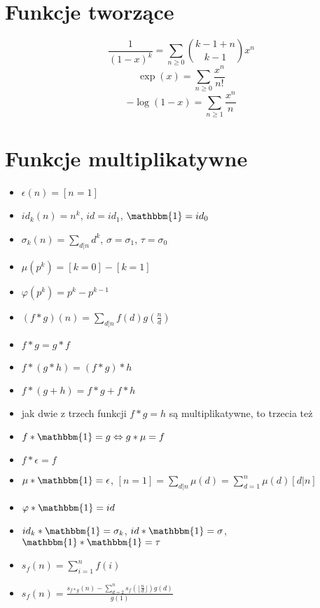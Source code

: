 \section{Funkcje tworzące}
		$$ \dfrac{1}{\left(1-x\right)^k} = \sum_{n\geq 0} \binom{k - 1 + n}{k - 1} x ^ n $$
		$$ \exp(x) = \sum_{n\geq 0} \dfrac{x^n}{n!} $$
		$$ -\log(1 - x) = \sum_{n\geq 1} \dfrac{x^n}{n} $$

\section{Funkcje multiplikatywne}
		\begin{itemize}[noitemsep]
			\item $\epsilon\left(n\right) = [n = 1]$
			\item $id_k\left(n\right) = n^k$, $id = id_1$, $\mathbbm{1} = id_0$
			\item $\sigma_k\left(n\right) = \sum_{d|n}d^k$, $\sigma = \sigma_1$, $\tau = \sigma_0$
			\item $\mu\left(p^k\right) = [k = 0] - [k = 1]$
			\item $\varphi\left(p^k\right) = p^k - p^{k - 1}$
			\item $\left(f \ast g\right)\left(n\right) = \sum_{d|n}f\left(d\right)g\left(\frac{n}{d}\right)$
			\item $f \ast g = g \ast f$
			\item $f \ast \left(g \ast h\right) = \left(f \ast g\right) \ast h$
			\item $f \ast \left(g + h\right) = f \ast g + f \ast h$
			\item jak dwie z trzech funkcji $f \ast g = h$ są multiplikatywne, to trzecia też
			\item $f \ast \mathbbm{1} = g \Leftrightarrow g \ast \mu = f$
			\item $f \ast \epsilon = f$
			\item $\mu \ast \mathbbm{1} = \epsilon$, $[n = 1] = \sum_{d|n}\mu\left(d\right) =\sum_{d=1}^n\mu\left(d\right)[d|n]$
			\item $\varphi \ast \mathbbm{1} = id$
			\item $id_k \ast \mathbbm{1} = \sigma_k$, $id \ast \mathbbm{1} = \sigma$, $\mathbbm{1} \ast \mathbbm{1} = \tau$
			\item $s_f\left(n\right) = \sum_{i=1}^nf\left(i\right)$
			\item $s_f\left(n\right) = \frac{s_{f\ast g}\left(n\right) - \sum_{d=2}^n s_f\left(\lfloor\frac{n}{d}\rfloor\right)g\left(d\right)}{g\left(1\right)}$
		\end{itemize}

